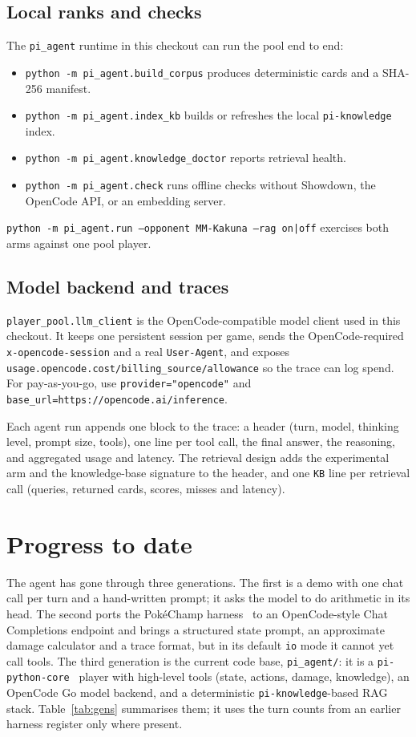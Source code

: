\documentclass[11pt,a4paper]{article}
\newcommand{\code}[1]{\texttt{#1}}
\begin{document}
\subsection{Local ranks and checks}
The \code{pi\_agent} runtime in this checkout can run the pool end to end:
\begin{itemize}
  \item \code{python -m pi\_agent.build\_corpus} produces deterministic cards and a SHA-256 manifest.
  \item \code{python -m pi\_agent.index\_kb} builds or refreshes the local \code{pi-knowledge} index.
  \item \code{python -m pi\_agent.knowledge\_doctor} reports retrieval health.
  \item \code{python -m pi\_agent.check} runs offline checks without Showdown, the OpenCode API, or an
        embedding server.
\end{itemize}
\code{python -m pi\_agent.run --opponent MM-Kakuna --rag on|off} exercises both arms against one pool player.

\subsection{Model backend and traces}
\code{player\_pool.llm\_client} is the OpenCode-compatible model client used in this checkout. It keeps one
persistent session per game, sends the OpenCode-required \code{x-opencode-session} and a real
\code{User-Agent}, and exposes \code{usage.opencode.cost/billing\_source/allowance} so the trace can log
spend. For pay-as-you-go, use \code{provider="opencode"} and
\code{base\_url=https://opencode.ai/inference}.

Each agent run appends one block to the trace: a header (turn, model, thinking level, prompt size, tools),
one line per tool call, the final answer, the reasoning, and aggregated usage and latency. The retrieval
design adds the experimental arm and the knowledge-base signature to the header, and one \code{KB} line per
retrieval call (queries, returned cards, scores, misses and latency).

\section{Progress to date}
\label{sec:progress}

The agent has gone through three generations. The first is a demo with one chat call per
turn and a hand-written prompt; it asks the model to do arithmetic in its head. The second ports the
Pok\'eChamp harness~\cite{pokechamp} to an OpenCode-style Chat Completions endpoint and brings a structured
state prompt, an approximate damage calculator and a trace format, but in its default \code{io} mode it
cannot yet call tools. The third generation is the current code base, \code{pi\_agent/}: it is a
\code{pi-python-core}~\cite{pi} player with high-level tools (state, actions, damage, knowledge), an OpenCode
Go model backend, and a deterministic \code{pi-knowledge}-based RAG stack. Table~\ref{tab:gens} summarises
them; it uses the turn counts from an earlier harness register only where present.
\end{document}
